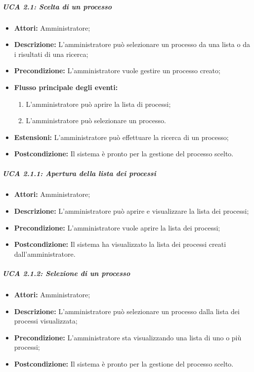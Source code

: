 \subparagraph{UCA 2.1: Scelta di un processo}
\begin{itemize}
\item \textbf{Attori:} Amministratore;
\item \textbf{Descrizione:} L'amministratore può selezionare un processo da una lista o da i risultati di una ricerca;
\item \textbf{Precondizione:} L'amministratore vuole gestire un processo creato;
\item \textbf{Flusso principale degli eventi:}
\begin{enumerate}
\item L'amministratore può aprire la lista di processi;
\item L'amministratore può selezionare un processo.
\end{enumerate}
\item \textbf{Estensioni:} L'amministratore può effettuare la ricerca di un processo;
\item \textbf{Postcondizione:} Il sistema è pronto per la gestione del processo scelto.
\end{itemize}

\subparagraph{UCA 2.1.1: Apertura della lista dei processi}
\begin{itemize}
\item \textbf{Attori:} Amministratore;
\item \textbf{Descrizione:} L'amministratore può aprire e visualizzare la lista dei processi;
\item \textbf{Precondizione:} L'amministratore vuole aprire la lista dei processi;
\item \textbf{Postcondizione:} Il sistema ha visualizzato la lista dei processi creati dall'amministratore.
\end{itemize}

\subparagraph{UCA 2.1.2: Selezione di un processo}
\begin{itemize}
\item \textbf{Attori:} Amministratore;
\item \textbf{Descrizione:} L'amministratore può selezionare un processo dalla lista dei processi visualizzata;
\item \textbf{Precondizione:} L'amministratore sta visualizzando una lista di uno o più processi;
\item \textbf{Postcondizione:} Il sistema è pronto per la gestione del processo scelto.
\end{itemize}

